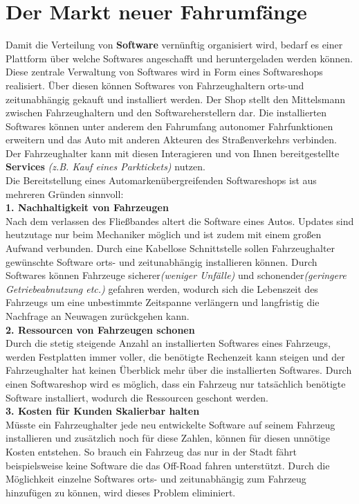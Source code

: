 \section{Der Markt neuer Fahrumfänge}\label{markt}
Damit die Verteilung von \textbf{Software} vernünftig organisiert wird, bedarf es einer Plattform über welche Softwares angeschafft und heruntergeladen werden können. Diese zentrale Verwaltung von Softwares wird in Form eines Softwareshops realisiert. Über diesen können Softwares von Fahrzeughaltern orts-und zeitunabhängig gekauft und installiert werden. Der Shop stellt den Mittelsmann zwischen Fahrzeughaltern und den Softwareherstellern dar. Die installierten Softwares können unter anderem den Fahrumfang autonomer Fahrfunktionen erweitern und das Auto mit anderen Akteuren des Straßenverkehrs verbinden. Der Fahrzeughalter kann mit diesen Interagieren und von Ihnen bereitgestellte \textbf{Services} \textit{(z.B. Kauf eines Parktickets)} nutzen.\\
Die Bereitstellung eines Automarkenübergreifenden Softwareshops ist aus mehreren Gründen sinnvoll:\\

\textbf{1. Nachhaltigkeit von Fahrzeugen}\\
Nach dem verlassen des Fließbandes altert die Software eines Autos. Updates sind heutzutage nur beim Mechaniker möglich und ist zudem mit einem großen Aufwand verbunden. Durch eine Kabellose Schnittstelle sollen Fahrzeughalter gewünschte Software orts- und zeitunabhängig installieren können. Durch Softwares können Fahrzeuge sicherer\textit{(weniger Unfälle)} und schonender\textit{(geringere Getriebeabnutzung etc.)} gefahren werden, wodurch sich die Lebenszeit des Fahrzeugs um eine unbestimmte Zeitspanne verlängern und langfristig die Nachfrage an Neuwagen zurückgehen kann.\\


\textbf{2. Ressourcen von Fahrzeugen schonen}\\
Durch die stetig steigende Anzahl an installierten Softwares eines Fahrzeugs, werden Festplatten immer voller, die benötigte Rechenzeit kann steigen und der Fahrzeughalter hat keinen Überblick mehr über die installierten Softwares. Durch einen Softwareshop wird es möglich, dass ein Fahrzeug nur tatsächlich benötigte Software installiert, wodurch die Ressourcen geschont werden.\\

\textbf{3. Kosten für Kunden Skalierbar halten}\\
Müsste ein Fahrzeughalter jede neu entwickelte Software auf seinem Fahrzeug installieren und zusätzlich noch für diese Zahlen, können für diesen unnötige Kosten entstehen. So brauch ein Fahrzeug das nur in der Stadt fährt beispielsweise keine Software die das Off-Road fahren unterstützt. Durch die Möglichkeit einzelne Softwares orts- und zeitunabhängig zum Fahrzeug hinzufügen zu können, wird dieses Problem eliminiert.\\

